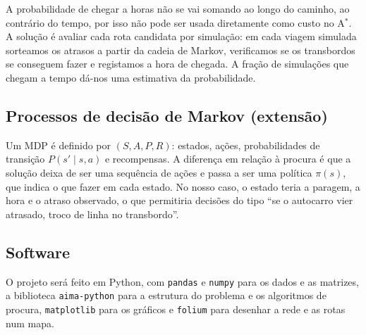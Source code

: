 \documentclass[11pt,a4paper]{article}
\newcommand{\AStar}{A$^{*}$}
\begin{document}
A probabilidade de chegar a horas não se vai somando ao longo do
caminho, ao contrário do tempo, por isso não pode ser usada diretamente
como custo no \AStar{}. A solução é avaliar cada rota candidata por
simulação: em cada viagem simulada sorteamos os atrasos a partir da
cadeia de Markov, verificamos se os transbordos se conseguem fazer e
registamos a hora de chegada. A fração de simulações que chegam a tempo
dá-nos uma estimativa da probabilidade.

\subsection{Processos de decisão de Markov (extensão)}

Um MDP é definido por $(S, A, P, R)$: estados, ações, probabilidades de
transição $P(s' \mid s, a)$ e recompensas. A diferença em relação à
procura é que a solução deixa de ser uma sequência de ações e passa a
ser uma política $\pi(s)$, que indica o que fazer em cada estado. No
nosso caso, o estado teria a paragem, a hora e o atraso observado, o que
permitiria decisões do tipo ``se o autocarro vier atrasado, troco de
linha no transbordo''.

\subsection{Software}

O projeto será feito em Python, com \texttt{pandas} e \texttt{numpy}
para os dados e as matrizes, a biblioteca \texttt{aima-python}
\cite{aimapython} para a estrutura do problema e os algoritmos de
procura, \texttt{matplotlib} para os gráficos e \texttt{folium} para
desenhar a rede e as rotas num mapa.


\end{document}
